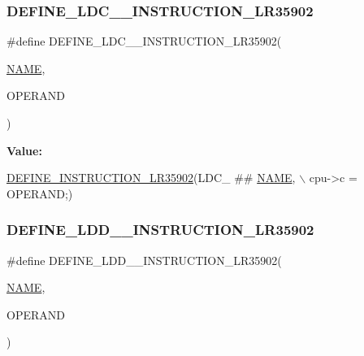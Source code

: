 \subsubsection{\texorpdfstring{D\+E\+F\+I\+N\+E\+\_\+\+L\+D\+C\+\_\+\+\_\+\+I\+N\+S\+T\+R\+U\+C\+T\+I\+O\+N\+\_\+\+L\+R35902}{DEFINE\_LDC\_\_INSTRUCTION\_LR35902}}
{\footnotesize\ttfamily \#define D\+E\+F\+I\+N\+E\+\_\+\+L\+D\+C\+\_\+\+\_\+\+I\+N\+S\+T\+R\+U\+C\+T\+I\+O\+N\+\_\+\+L\+R35902(\begin{DoxyParamCaption}\item[{}]{\mbox{\hyperlink{inflate_8h_a164ea0159d5f0b5f12a646f25f99eceaa67bc2ced260a8e43805d2480a785d312}{N\+A\+ME}},  }\item[{}]{O\+P\+E\+R\+A\+ND }\end{DoxyParamCaption})}

{\bfseries Value\+:}
\begin{DoxyCode}
\mbox{\hyperlink{isa-lr35902_8c_a3128fc43c5d01e8b51f67901c0b4b5ef}{DEFINE\_INSTRUCTION\_LR35902}}(LDC\_ ## \mbox{\hyperlink{inflate_8h_a164ea0159d5f0b5f12a646f25f99eceaa67bc2ced260a8e43805d2480a785d312}{NAME}}, \(\backslash\)
        cpu->c = OPERAND;)
\end{DoxyCode}
\mbox{\label{isa-lr35902_8c_a4d47351734766869a8250372b5f53cad}} 
\subsubsection{\texorpdfstring{D\+E\+F\+I\+N\+E\+\_\+\+L\+D\+D\+\_\+\+\_\+\+I\+N\+S\+T\+R\+U\+C\+T\+I\+O\+N\+\_\+\+L\+R35902}{DEFINE\_LDD\_\_INSTRUCTION\_LR35902}}
{\footnotesize\ttfamily \#define D\+E\+F\+I\+N\+E\+\_\+\+L\+D\+D\+\_\+\+\_\+\+I\+N\+S\+T\+R\+U\+C\+T\+I\+O\+N\+\_\+\+L\+R35902(\begin{DoxyParamCaption}\item[{}]{\mbox{\hyperlink{inflate_8h_a164ea0159d5f0b5f12a646f25f99eceaa67bc2ced260a8e43805d2480a785d312}{N\+A\+ME}},  }\item[{}]{O\+P\+E\+R\+A\+ND }\end{DoxyParamCaption})}

